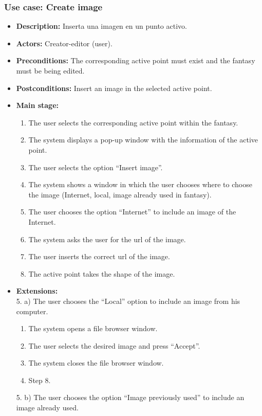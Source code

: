 \subsubsection{Use case: Create image}
\begin{itemize}
	\item \textbf{Description:} Inserta una imagen en un punto activo.
	\item \textbf{Actors:} Creator-editor (user).
	\item \textbf{Preconditions:} The corresponding active point must exist and the fantasy must be being edited.
	\item \textbf{Postconditions:} Insert an image in the selected active point.
	\item \textbf{Main stage:}
	\begin{enumerate}
		\item The user selects the corresponding active point within the fantasy.
		\item The system displays a pop-up window with the information of the active point.
		\item The user selects the option ``Insert image''.
		\item The system shows a window in which the user chooses where to choose the image (Internet, local, image already used in fantasy).
		\item The user chooses the option ``Internet'' to include an image of the Internet.
		\item The system asks the user for the url of the image.
		\item The user inserts the correct url of the image.
		\item The active point takes the shape of the image.
	\end{enumerate}
	\item \textbf{Extensions:} \\5. a) The user chooses the ``Local'' option to include an image from his computer.
	\begin{enumerate}
		\item The system opens a file browser window.
		\item The user selects the desired image and press ``Accept''.
		\item The system closes the file browser window.
		\item Step 8.
	\end{enumerate}
	5. b) The user chooses the option ``Image previously used'' to include an image already used.
	\begin{enumerate}

\end{enumerate}
\end{itemize}
